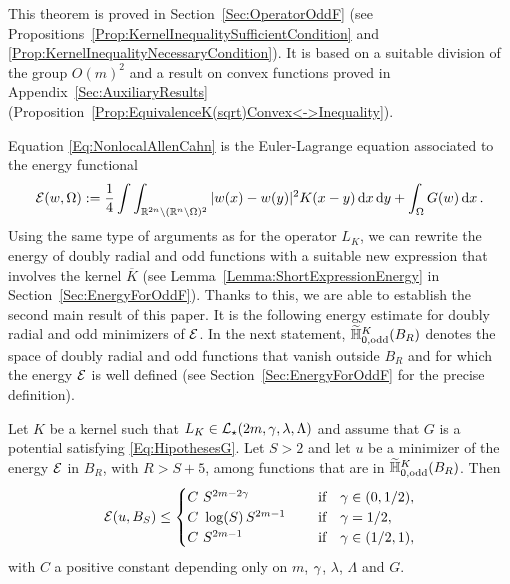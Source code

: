 This theorem is proved in Section~\ref{Sec:OperatorOddF} (see Propositions~\ref{Prop:KernelInequalitySufficientCondition} and \ref{Prop:KernelInequalityNecessaryCondition}). It is based on a suitable division of the group $O(m)^2$ and a result on convex functions proved in Appendix~\ref{Sec:AuxiliaryResults} (Proposition~\ref{Prop:EquivalenceK(sqrt)Convex<->Inequality}).

Equation \eqref{Eq:NonlocalAllenCahn} is the Euler-Lagrange equation associated to the energy functional
\begin{equation*}
\mathcal{E}(w, \Omega) := \dfrac{1}{4}\int\int_{\mathbb{R}^{2n} \setminus (\mathbb{R}^n\setminus\Omega)^2} |w(x) - w(y)|^2 K(x-y) \,\mathrm{d} x \,\mathrm{d} y + \int_{\Omega} G(w) \,\mathrm{d} x \,.
\end{equation*}
Using the same type of arguments as for the operator $L_K$, we can rewrite the energy of doubly radial and odd functions with a suitable new expression that involves the kernel $\overline{K}$ (see Lemma~\ref{Lemma:ShortExpressionEnergy} in  Section~\ref{Sec:EnergyForOddF}). Thanks to this, we are able to establish the second main result of this paper. It is the following energy estimate for doubly radial and odd minimizers of $\mathcal{E}$. In the next statement, $\widetilde{\mathbb{H}}^K_{0, \mathrm{odd}}(B_R)$ denotes the space of doubly radial and odd functions that vanish outside $B_R$ and for which the energy $\mathcal{E}$ is well defined (see Section~\ref{Sec:EnergyForOddF} for the precise definition).

\begin{theorem}
	\label{Th:EnergyEstimate} 
	Let $K$ be a kernel such that $L_K\in \mathcal{L}_\star(2m, \gamma, \lambda, \Lambda)$ and assume that $G$ is a potential satisfying \eqref{Eq:HipothesesG}. Let $S>2$ and let $u$ be a minimizer of the energy $\mathcal{E}$ in $B_{R}$, with $R>S+5$, among functions that are in $\widetilde{\mathbb{H}}^K_{0, \mathrm{odd}}(B_R)$. Then
	$$ \mathcal{E} (u,B_S) \leq \begin{cases}
	C \ S^{2m-2\gamma}\ \ \ \ &\textrm{if } \ \ \gamma\in(0,1/2),\\
	C\ \log(S)\,S^{2m-1}\ \ \ \ &\textrm{if } \ \ \gamma=1/2,\\
	C \ S^{2m-1}\ \ \ \ &\textrm{if } \ \ \gamma\in(1/2,1),\\
	\end{cases} $$
	with $C$ a positive constant depending only on $m$, $\gamma$, $\lambda$, $\Lambda$ and $G$.
\end{theorem}



